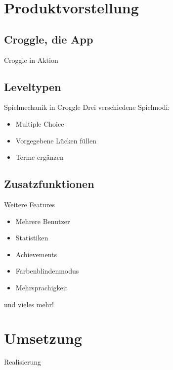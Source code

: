 \documentclass[18pt]{beamer}
\begin{document}
\section{Produktvorstellung}
	\subsection{Croggle, die App}
	\begin{frame}{Croggle in Aktion}
	\end{frame}
	
	\subsection{Leveltypen}
	\begin{frame}[<+->]{Spielmechanik in Croggle}
		Drei verschiedene Spielmodi:
		\begin{itemize}
			\item Multiple Choice
			\item Vorgegebene Lücken füllen
			\item Terme ergänzen
		\end{itemize}
	\end{frame}

	\subsection{Zusatzfunktionen}
	\begin{frame}[<+->]{Weitere Features}
		\begin{itemize}
			\item Mehrere Benutzer
			\item Statistiken
			\item Achievements
			\item Farbenblindenmodus
			\item Mehrsprachigkeit
		\end{itemize}
		und vieles mehr!
	\end{frame}

\section{Umsetzung}
	\begin{frame}{Realisierung}
	\end{frame}
\end{document}
